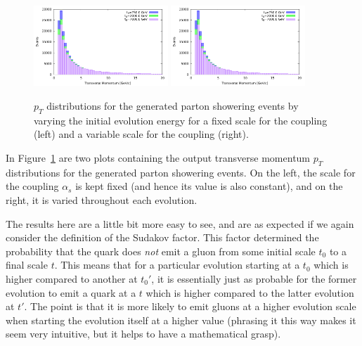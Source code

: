 \begin{figure}[ht]
  \centering
  \includegraphics[width=0.45\textwidth]{./res/gfx/pt-fixed2.pdf}
  \includegraphics[width=0.45\textwidth]{./res/gfx/pt-variable2.pdf}
  \caption{$p_T$ distributions for the generated parton showering events by varying the initial evolution energy for a fixed scale for the coupling (left) and a variable scale for the coupling (right).}
  \label{fig:pt-dist}
\end{figure}

In Figure~\ref{fig:pt-dist} are two plots containing the output transverse momentum $p_T$ distributions for the generated parton showering events. On the left, the scale for the coupling $\alpha_s$ is kept fixed (and hence its value is also constant), and on the right, it is varied throughout each evolution.

The results here are a little bit more easy to see, and are as expected if we again consider the definition of the Sudakov factor. This factor determined the probability that the quark does \textit{not} emit a gluon from some initial scale $t_0$ to a final scale $t$. This means that for a particular evolution starting at a $t_0$ which is higher compared to another at $t_0'$, it is essentially just as probable for the former evolution to emit a quark at a $t$ which is higher compared to the latter evolution at $t'$. The point is that it is more likely to emit gluons at a higher evolution scale when starting the evolution itself at a higher value (phrasing it this way makes it seem very intuitive, but it helps to have a mathematical grasp).

